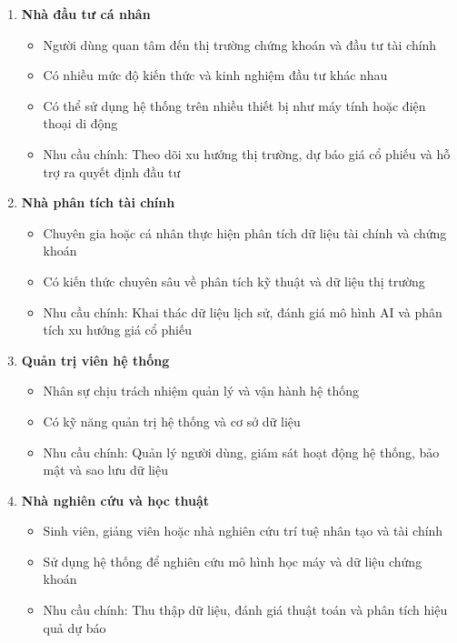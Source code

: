 \documentclass[12pt, a4paper]{article}
\begin{document}
\begin{enumerate}
    \renewcommand{\labelenumi}{\arabic{enumi})}
    \item \textbf{Nhà đầu tư cá nhân}
          \begin{itemize}
              \item Người dùng quan tâm đến thị trường chứng khoán và đầu tư tài chính
              \item Có nhiều mức độ kiến thức và kinh nghiệm đầu tư khác nhau
              \item Có thể sử dụng hệ thống trên nhiều thiết bị như máy tính hoặc điện thoại di động
              \item Nhu cầu chính: Theo dõi xu hướng thị trường, dự báo giá cổ phiếu và hỗ trợ ra quyết định đầu tư
          \end{itemize}

    \item \textbf{Nhà phân tích tài chính}
          \begin{itemize}
              \item Chuyên gia hoặc cá nhân thực hiện phân tích dữ liệu tài chính và chứng khoán
              \item Có kiến thức chuyên sâu về phân tích kỹ thuật và dữ liệu thị trường
              \item Nhu cầu chính: Khai thác dữ liệu lịch sử, đánh giá mô hình AI và phân tích xu hướng giá cổ phiếu
          \end{itemize}

    \item \textbf{Quản trị viên hệ thống}
          \begin{itemize}
              \item Nhân sự chịu trách nhiệm quản lý và vận hành hệ thống
              \item Có kỹ năng quản trị hệ thống và cơ sở dữ liệu
              \item Nhu cầu chính: Quản lý người dùng, giám sát hoạt động hệ thống, bảo mật và sao lưu dữ liệu
          \end{itemize}

    \item \textbf{Nhà nghiên cứu và học thuật}
          \begin{itemize}
              \item Sinh viên, giảng viên hoặc nhà nghiên cứu trí tuệ nhân tạo và tài chính
              \item Sử dụng hệ thống để nghiên cứu mô hình học máy và dữ liệu chứng khoán
              \item Nhu cầu chính: Thu thập dữ liệu, đánh giá thuật toán và phân tích hiệu quả dự báo
          \end{itemize}

\end{enumerate}
\end{document}
